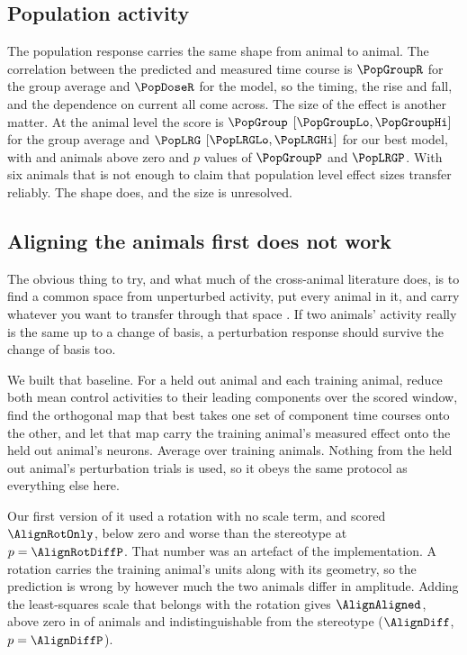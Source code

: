 \documentclass[11pt,letterpaper]{article}
\begin{document}
\subsection{Population activity}

The population response carries the same shape from animal to animal. The correlation
between the predicted and measured time course is $\PopGroupR$ for the group average
and $\PopDoseR$ for the model, so the timing, the rise and fall, and the dependence on
current all come across. The size of the effect is another matter. At the animal level
the score is $\PopGroup$ $[\PopGroupLo, \PopGroupHi]$ for the group average and
$\PopLRG$ $[\PopLRGLo, \PopLRGHi]$ for our best model, with \PopGroupPos{} and
\PopLRGPos{} animals above zero and $p$ values of $\PopGroupP$ and $\PopLRGP$. With six
animals that is not enough to claim that population level effect sizes transfer
reliably. The shape does, and the size is unresolved.

\subsection{Aligning the animals first does not work}

The obvious thing to try, and what much of the cross-animal literature does, is to find
a common space from unperturbed activity, put every animal in it, and carry whatever you
want to transfer through that space
\citep{marble,candy,cca,procrustes,dsa}. If two animals' activity really is the same up
to a change of basis, a perturbation response should survive the change of basis too.

We built that baseline. For a held out animal and each training animal, reduce both mean
control activities to their leading components over the scored window, find the
orthogonal map that best takes one set of component time courses onto the other, and let
that map carry the training animal's measured effect onto the held out animal's neurons.
Average over training animals. Nothing from the held out animal's perturbation trials is
used, so it obeys the same protocol as everything else here.

Our first version of it used a rotation with no scale term, and scored
$\AlignRotOnly$, below zero and worse than the stereotype at $p = \AlignRotDiffP$. That
number was an artefact of the implementation. A rotation carries the training animal's
units along with its geometry, so the prediction is wrong by however much the two animals
differ in amplitude. Adding the least-squares scale that belongs with the rotation gives
$\AlignAligned$, above zero in \AlignAlignedPos{} of \AlignAlignedN{} animals and
indistinguishable from the stereotype ($\AlignDiff$, $p = \AlignDiffP$).
\end{document}
